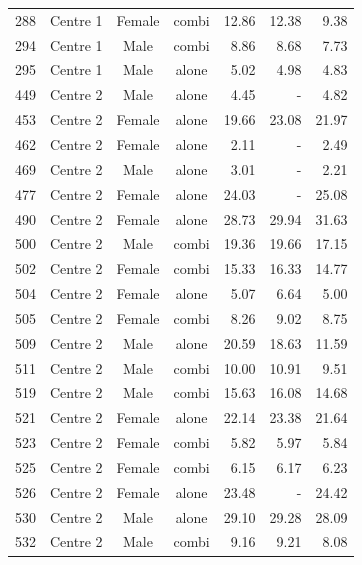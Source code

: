 \begin{table}[p]
\begin{tabular}{|cccc|rrr|}
288&Centre 1&Female&combi&12.86&12.38&9.38\\
294&Centre 1&Male&combi&8.86&8.68&7.73\\
295&Centre 1&Male&alone&5.02&4.98&4.83\\
449&Centre 2&Male&alone&4.45&-&4.82\\
453&Centre 2&Female&alone&19.66&23.08&21.97\\
462&Centre 2&Female&alone&2.11&-&2.49\\
469&Centre 2&Male&alone&3.01&-&2.21\\
477&Centre 2&Female&alone&24.03&-&25.08\\
490&Centre 2&Female&alone&28.73&29.94&31.63\\
500&Centre 2&Male&combi&19.36&19.66&17.15\\
502&Centre 2&Female&combi&15.33&16.33&14.77\\
504&Centre 2&Female&alone&5.07&6.64&5.00\\
505&Centre 2&Female&combi&8.26&9.02&8.75\\
509&Centre 2&Male&alone&20.59&18.63&11.59\\
511&Centre 2&Male&combi&10.00&10.91&9.51\\
519&Centre 2&Male&combi&15.63&16.08&14.68\\
521&Centre 2&Female&alone&22.14&23.38&21.64\\
523&Centre 2&Female&combi&5.82&5.97&5.84\\
525&Centre 2&Female&combi&6.15&6.17&6.23\\
526&Centre 2&Female&alone&23.48&-&24.42\\
530&Centre 2&Male&alone&29.10&29.28&28.09\\
532&Centre 2&Male&combi&9.16&9.21&8.08\\
\hline
\end{tabular}
\end{table}

